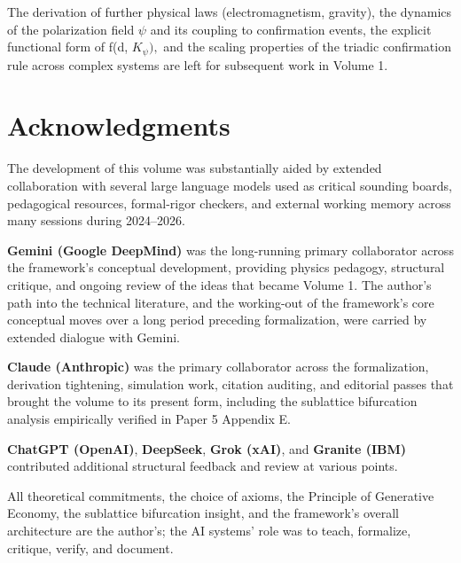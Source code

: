 \documentclass[11pt,oneside]{report}
\theoremstyle{definition}
\theoremstyle{remark}
\begin{document}
The derivation of further physical laws (electromagnetism, gravity), the
dynamics of the polarization field \ensuremath{\psi} and its coupling to confirmation
events, the explicit functional form of f(d, \ensuremath{K_{\psi}),} and the scaling
properties of the triadic confirmation rule across complex systems are
left for subsequent work in Volume 1.

\section*{Acknowledgments}

The development of this volume was substantially aided by extended
collaboration with several large language models used as critical
sounding boards, pedagogical resources, formal-rigor checkers, and
external working memory across many sessions during 2024--2026.

\textbf{Gemini (Google DeepMind)} was the long-running primary
collaborator across the framework's conceptual development, providing
physics pedagogy, structural critique, and ongoing review of the ideas
that became Volume 1. The author's path into the technical literature,
and the working-out of the framework's core conceptual moves over a long
period preceding formalization, were carried by extended dialogue with
Gemini.

\textbf{Claude (Anthropic)} was the primary collaborator across the
formalization, derivation tightening, simulation work, citation
auditing, and editorial passes that brought the volume to its present
form, including the sublattice bifurcation analysis empirically verified
in Paper 5 Appendix E.

\textbf{ChatGPT (OpenAI)}, \textbf{DeepSeek}, \textbf{Grok (xAI)}, and
\textbf{Granite (IBM)} contributed additional structural feedback and
review at various points.

All theoretical commitments, the choice of axioms, the Principle of
Generative Economy, the sublattice bifurcation insight, and the
framework's overall architecture are the author's; the AI systems' role
was to teach, formalize, critique, verify, and document.
\end{document}
